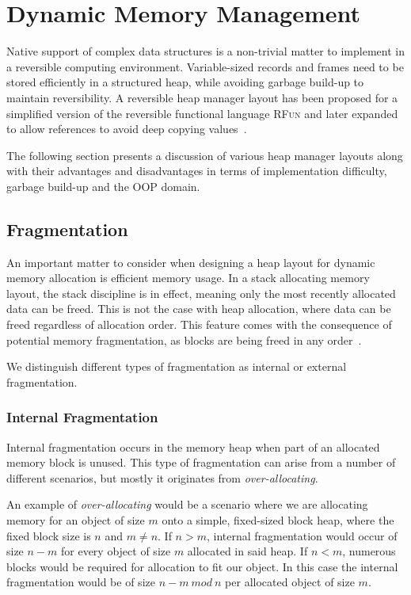 \chapter{Dynamic Memory Management}
\label{chp:dynamic-memory-management}
Native support of complex data structures is a non-trivial matter to implement in a reversible computing environment. Variable-sized records and frames need to be stored efficiently in a structured heap, while avoiding garbage build-up to maintain reversibility. A reversible heap manager layout has been proposed for a simplified version of the reversible functional language \textsc{RFun} and later expanded to allow references to avoid deep copying values~\cite{ha:heap, ty:rfun, tm:refcounting}.

The following section presents a discussion of various heap manager layouts along with their advantages and disadvantages in terms of implementation difficulty, garbage build-up and the OOP domain. 

\section{Fragmentation}
\label{sec:fragmentation}
An important matter to consider when designing a heap layout for dynamic memory allocation is efficient memory usage. In a stack allocating memory layout, the stack discipline is in effect, meaning only the most recently allocated data can be freed. This is not the case with heap allocation, where data can be freed regardless of allocation order. This feature comes with the consequence of potential memory fragmentation, as blocks are being freed in any order~\cite{tm:languages}.

We distinguish different types of fragmentation as internal or external fragmentation.

\subsection{Internal Fragmentation}
Internal fragmentation occurs in the memory heap when part of an allocated memory block is unused. This type of fragmentation can arise from a number of different scenarios, but mostly it originates from \textit{over-allocating}. 

An example of \textit{over-allocating} would be a scenario where we are allocating memory for an object of size $m$ onto a simple, fixed-sized block heap, where the fixed block size is $n$ and $m \neq n$. If $n > m$, internal fragmentation would occur of size $n-m$ for every object of size $m$ allocated in said heap. If $n < m$, numerous blocks would be required for allocation to fit our object. In this case the internal fragmentation would be of size $n - m\ mod\ n$ per allocated object of size $m$. 

